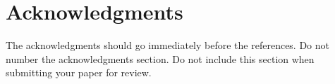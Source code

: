 \documentclass[11pt]{article}
\newcommand\BibTeX{B{\sc ib}\TeX}
\begin{document}








\section*{Acknowledgments}

The acknowledgments should go immediately before the references.  Do
not number the acknowledgments section. Do not include this section
when submitting your paper for review.
\end{document}

